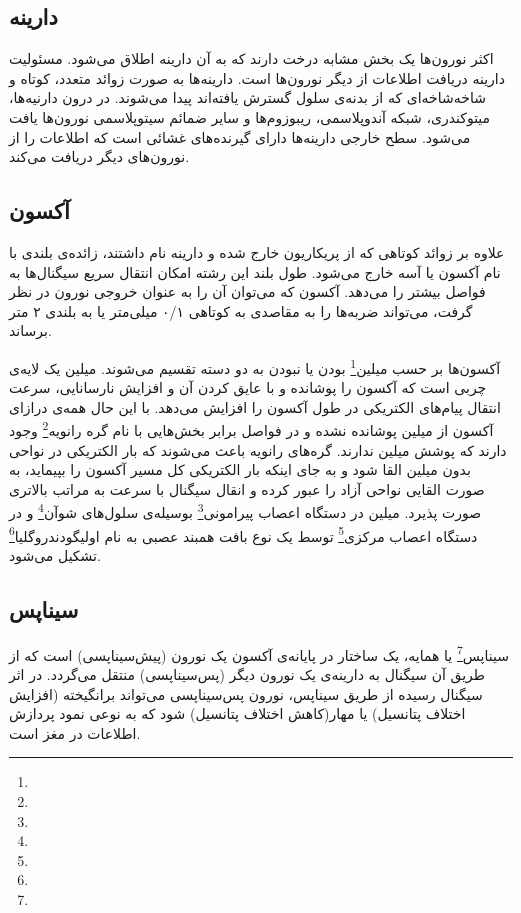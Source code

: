 \subsection{دارینه}
اکثر نورون‌ها یک بخش مشابه درخت دارند که به آن دارینه اطلاق می‌شود. مسئولیت دارینه دریافت اطلاعات از دیگر نورون‌ها است. دارینه‌ها به صورت زوائد متعدد، کوتاه و شاخه‌شاخه‌ای که از بدنه‌ی سلول گسترش یافته‌اند پیدا می‌شوند. در درون دارنیه‌ها، میتوکندری، شبکه آندوپلاسمی، ریبوزوم‌ها و سایر ضمائم سیتوپلاسمی نورون‌ها یافت می‌شود. سطح خارجی دارینه‌ها دارای گیرنده‌های غشائی است که اطلاعات را از نورون‌های دیگر دریافت می‌کند.

\subsection{آکسون}
علاوه بر زوائد کوتاهی که از پریکاریون خارج شده و دارینه نام داشتند، زائده‌ی بلندی با نام آکسون یا آسه خارج می‌شود. طول بلند این رشته امکان انتقال سریع سیگنال‌ها به فواصل بیشتر را می‌دهد. آکسون که می‌توان آن را به عنوان خروجی نورون در نظر گرفت، می‌تواند ضربه‌ها را به مقاصدی به کوتاهی ۰/۱ میلی‌متر یا به بلندی ۲ متر برساند. 

آکسون‌ها بر حسب میلین\footnote{} بودن یا نبودن به دو دسته تقسیم می‌شوند. میلین یک لایه‌ی چربی است که آکسون را پوشانده و با عایق کردن آن و افزایش نارسانایی، سرعت انتقال پیام‌های الکتریکی در طول آکسون را افزایش می‌دهد. با این حال همه‌ی درازای آکسون از میلین پوشانده نشده و در فواصل برابر بخش‌هایی با نام گره رانویه\footnote{} وجود دارند که پوشش میلین ندارند. گره‌های رانویه باعث می‌شوند که بار الکتریکی در نواحی بدون میلین القا شود و به جای اینکه بار الکتریکی کل مسیر آکسون را بپیماید، به صورت القایی نواحی آزاد را عبور کرده و انقال سیگنال با سرعت به مراتب بالاتری صورت پذیرد. میلین در دستگاه اعصاب پیرامونی\footnote{} بوسیله‌ی سلول‌های شوآن\footnote{} و در دستگاه اعصاب مرکزی\footnote{} توسط یک نوع بافت همبند عصبی به نام اولیگودندروگلیا\footnote{}  تشکیل می‌شود. 

\subsection{سیناپس}
سیناپس\footnote{} یا همایه، یک ساختار در پایانه‌ی آکسون یک نورون (پیش‌سیناپسی) است که از طریق آن سیگنال به دارینه‌ی یک نورون دیگر (پس‌سیناپسی) منتقل می‌گردد. در اثر سیگنال رسیده از طریق سیناپس، نورون پس‌سیناپسی می‌تواند برانگیخته (افزایش اختلاف پتانسیل) یا مهار(کاهش اختلاف پتانسیل) شود که به نوعی نمود پردازش اطلاعات در مغز است. 

